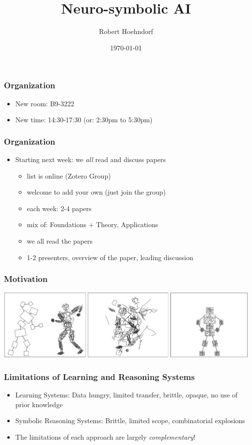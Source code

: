 \documentclass{beamer}
\title{Neuro-symbolic AI}
\author{Robert Hoehndorf}
\date{\today}
\begin{document}
\frame{\titlepage}

\begin{frame}
\frametitle{Organization}
\begin{itemize}
\item New room: B9-3222
\item New time: 14:30-17:30 (or: 2:30pm to 5:30pm)
\end{itemize}
\end{frame}

\begin{frame}
\frametitle{Organization}
\begin{itemize}
\item Starting next week: we {\em all} read and discuss papers
  \begin{itemize}
  \item list is online (Zotero Group)
  \item welcome to add your own (just join the group)
  \item each week: 2-4 papers
  \item mix of: Foundations + Theory, Applications
  \item we all read the papers
  \item 1-2 presenters, overview of the paper, leading discussion
  \end{itemize}
\end{itemize}
\end{frame}


\begin{frame}
  \frametitle{Motivation}
  \includegraphics[width=\textwidth]{minsky-figure.png}
\end{frame}

\begin{frame}
\frametitle{Limitations of Learning and Reasoning Systems}
\begin{itemize}
\item Learning Systems: Data hungry, limited transfer, brittle,
  opaque, no use of prior knowledge
\item Symbolic Reasoning Systems: Brittle, limited scope,
  combinatorial explosions
  \pause
\item The limitations of each approach are largely {\em
    complementary}!
\end{itemize}
\end{frame}
\end{document}
